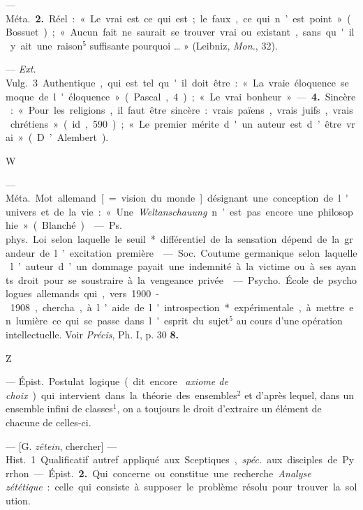 \begin{itemize}[leftmargin=1cm, label=, itemsep=1pt]
— \si{Méta.}  {\bf 2.} Réel : « Le vrai est ce qui est ; le faux, ce qui
n’est point » (Bossuet) ; « Aucun fait ne saurait se trouver vrai ou
existant, sans qu'il y ait une raison$^5$ suffisante pourquoi … » (Leibniz,
{\it Mon.}, 32).

— {\it Ext.} \si{Vulg.} 3 Authentique, qui est tel qu'il doit être : « La
vraie éloquence se moque de l'éloquence » (Pascal, 4) ; « Le vrai bonheur ». —
{\bf 4.} Sincère : « Pour les religions, il faut être sincère : vrais
païens, vrais juifs, vrais chrétiens » (id, 590) ; « Le premier mérite d'un
auteur est d’être vrai » (D’Alembert).

\begin{center}
W
\end{center}

 — \si{Méta.} Mot allemand [= vision du monde] désignant
une conception de l'univers et de la vie : « Une {\it Weltanschauung} n’est
pas encore une philosophie » (Blanché).

 — \si{Ps. phys.} Loi selon laquelle le seuil*
différentiel de la sensation dépend de la grandeur de l’excitation première.

 — \si{Soc.} Coutume germanique selon laquelle l’auteur d’un
dommage payait une indemnité à la victime ou à ses ayants droit pour se
soustraire à la vengeance privée.

 — \si{Psycho.} École de psychologues allemands qui,
vers 1900-1908, chercha, à l’aide de l'introspection* expérimentale, à mettre
en lumière ce qui se passe dans l'esprit du sujet$^5$ au cours d’une
opération intellectuelle. Voir {\it Précis}, Ph. I, p. 30 {\bf 8.}

\begin{center}
Z
\end{center}

 — \si{Épist.} Postulat logique (dit encore {\it
axiome de choix}) qui intervient dans la théorie des ensembles$^2$ et d’après
lequel, dans un ensemble infini de classes$^1$, on a toujours le droit
d'extraire un élément de chacune de celles-ci.

 — [G. {\it zêtein}, chercher] — \si{Hist.} 1. Qualificatif
autref. appliqué aux Sceptiques, {\it spéc.} aux disciples de Pyrrhon. —
\si{Épist.} {\bf 2.} Qui concerne ou constitue une recherche. {\it Analyse
zététique} : celle qui consiste à supposer le problème résolu pour trouver la
solution.

	\end{itemize}
